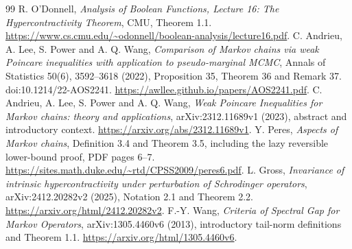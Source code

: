 \documentclass[11pt]{article}
\begin{document}
\begin{thebibliography}{99}
 R. O'Donnell, \emph{Analysis of Boolean Functions, Lecture 16: The Hypercontractivity Theorem}, CMU, Theorem 1.1. \url{https://www.cs.cmu.edu/~odonnell/boolean-analysis/lecture16.pdf}.
 C. Andrieu, A. Lee, S. Power and A. Q. Wang, \emph{Comparison of Markov chains via weak Poincare inequalities with application to pseudo-marginal MCMC}, Annals of Statistics 50(6), 3592--3618 (2022), Proposition 35, Theorem 36 and Remark 37. doi:10.1214/22-AOS2241. \url{https://awllee.github.io/papers/AOS2241.pdf}.
 C. Andrieu, A. Lee, S. Power and A. Q. Wang, \emph{Weak Poincare Inequalities for Markov chains: theory and applications}, arXiv:2312.11689v1 (2023), abstract and introductory context. \url{https://arxiv.org/abs/2312.11689v1}.
 Y. Peres, \emph{Aspects of Markov chains}, Definition 3.4 and Theorem 3.5, including the lazy reversible lower-bound proof, PDF pages 6--7. \url{https://sites.math.duke.edu/~rtd/CPSS2009/peres6.pdf}.
 L. Gross, \emph{Invariance of intrinsic hypercontractivity under perturbation of Schrodinger operators}, arXiv:2412.20282v2 (2025), Notation 2.1 and Theorem 2.2. \url{https://arxiv.org/html/2412.20282v2}.
 F.-Y. Wang, \emph{Criteria of Spectral Gap for Markov Operators}, arXiv:1305.4460v6 (2013), introductory tail-norm definitions and Theorem 1.1. \url{https://arxiv.org/html/1305.4460v6}.
\end{thebibliography}
\end{document}
